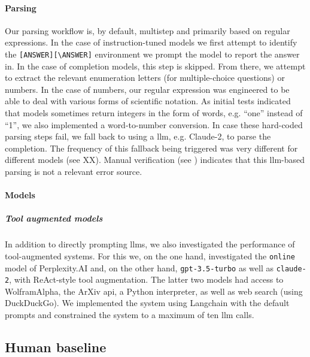\documentclass[11pt, oneside]{article}
\begin{document}
\paragraph{Parsing}
Our parsing workflow is, by default, multistep and primarily based on regular expressions. 
In the case of instruction-tuned models we first attempt to identify the \texttt{[ANSWER][\textbackslash ANSWER]} environment we prompt the model to report the answer in. 
In the case of completion models, this step is skipped. From there, we attempt to extract the relevant enumeration letters (for multiple-choice questions) or numbers. 
In the case of numbers, our regular expression was engineered to be able to deal with various forms of scientific notation. 
As initial tests indicated that models sometimes return integers in the form of words, e.g. \enquote{one} instead of \enquote{1}, we also implemented a word-to-number conversion. 
In case these hard-coded parsing steps fail, we fall back to using a \gls{llm}, e.g. Claude-2, to parse the completion. 
The frequency of this fallback being triggered was very different for different models (see XX). 
Manual verification (see ) indicates that this \gls{llm}-based parsing is not a relevant error source.

\paragraph{Models}



\subparagraph{Tool augmented models}
In addition to directly prompting \glspl{llm}, we also investigated the performance of tool-augmented systems.
For this we, on the one hand, investigated the \texttt{online} model of Perplexity.AI and, on the other hand, \texttt{gpt-3.5-turbo} as well as \texttt{claude-2}, with ReAct-style tool augmentation.\cite{yao2023react}
The latter two models had access to WolframAlpha, the ArXiv \gls{api}, a Python interpreter, as well as web search (using DuckDuckGo).
We implemented the system using Langchain with the default prompts and constrained the system to a maximum of ten \gls{llm} calls. 



\subsection{Human baseline}
\end{document}
